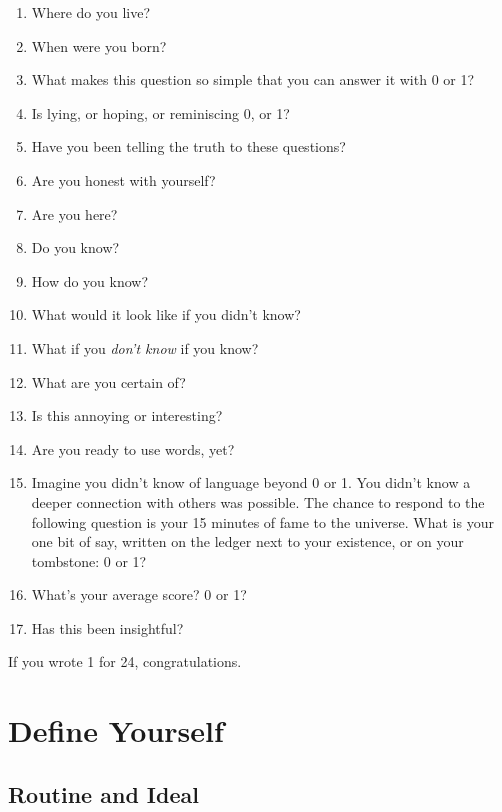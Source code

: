 \documentclass[
]{book}
\begin{document}
\begin{enumerate}
\def\labelenumi{\arabic{enumi}.}
\setcounter{enumi}{7}
\item
  Where do you live?
\item
  When were you born?
\item
  What makes this question so simple that you can answer it
  with 0 or 1?
\item
  Is lying, or hoping, or reminiscing 0, or 1?
\item
  Have you been telling the truth to these questions?
\item
  Are you honest with yourself?
\item
  Are you here?
\item
  Do you know?
\item
  How do you know?
\item
  What would it look like if you didn't know?
\item
  What if you \emph{don't know} if you know?
\item
  What are you certain of?
\item
  Is this annoying or interesting?
\item
  Are you ready to use words, yet?
\item
  Imagine you didn't know of language beyond 0 or 1.
  You didn't know a deeper connection with others was possible.
  The chance to respond to the following question is
  your 15 minutes of fame to the universe.
  What is your one bit of say,
  written on the ledger next to your existence, or
  on your tombstone: 0 or 1?
\item
  What's your average score? 0 or 1?
\item
  Has this been insightful?
\end{enumerate}

If you wrote 1 for 24, congratulations.

\hypertarget{define-yourself}{%
\chapter{Define Yourself}\label{define-yourself}}

\hypertarget{routine-and-ideal}{%
\section{Routine and Ideal}\label{routine-and-ideal}}
\end{document}
